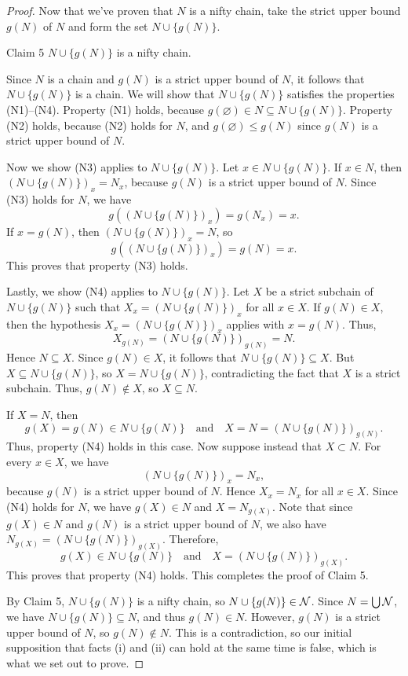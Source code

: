 \begin{proof}
	Now that we've proven that $N$ is a nifty chain, take the strict upper bound $g(N)$ of $N$ and form the set $N\cup\{g(N)\}$.
	
	\begin{manualthm}{Claim 5}
		$N\cup\{g(N)\}$ is a nifty chain.
	\end{manualthm}
	\begin{claimproof}
		Since $N$ is a chain and $g(N)$ is a strict upper bound of $N$, it follows that $N\cup\{g(N)\}$ is a chain.
		We will show that $N\cup\{g(N)\}$ satisfies the properties (N1)--(N4).
		Property (N1) holds, because $g(\varnothing)\in N\subseteq N\cup\{g(N)\}$.
		Property (N2) holds, because (N2) holds for $N$, and $g(\varnothing)\le g(N)$ since $g(N)$ is a strict upper bound of $N$.
		
		Now we show (N3) applies to $N\cup\{g(N)\}$.
		Let $x\in N\cup\{g(N)\}$.
		If $x\in N$, then $(N\cup\{g(N)\})_{x} = N_{x}$, because $g(N)$ is a strict upper bound of $N$.
		Since (N3) holds for $N$, we have
		\[ g((N\cup\{g(N)\})_{x}) = g(N_{x}) = x. \]
		If $x = g(N)$, then $(N\cup\{g(N)\})_{x} = N$, so
		\[ g((N\cup\{g(N)\})_{x}) = g(N) = x. \]
		This proves that property (N3) holds.
		
		Lastly, we show (N4) applies to $N\cup\{g(N)\}$.
		Let $X$ be a strict subchain of $N\cup\{g(N)\}$ such that $X_{x} = (N\cup\{g(N)\})_{x}$ for all $x\in X$.
		If $g(N)\in X$, then the hypothesis $X_{x} = (N\cup\{g(N)\})_{x}$ applies with $x = g(N)$.
		Thus,
		\[ X_{g(N)} = (N\cup\{g(N)\})_{g(N)} = N. \]
		Hence $N\subseteq X$.
		Since $g(N)\in X$, it follows that $N\cup\{g(N)\}\subseteq X$.
		But $X\subseteq N\cup\{g(N)\}$, so $X = N\cup\{g(N)\}$, contradicting the fact that $X$ is a strict subchain.
		Thus, $g(N)\notin X$, so $X\subseteq N$.
		
		If $X = N$, then 
		\[ g(X) = g(N)\in N\cup\{g(N)\} \quad\text{and}\quad X = N = (N\cup\{g(N)\})_{g(N)}. \]
		Thus, property (N4) holds in this case.
		Now suppose instead that $X\subset N$.
		For every $x\in X$, we have
		\[ (N\cup\{g(N)\})_{x} = N_{x}, \]
		because $g(N)$ is a strict upper bound of $N$.
		Hence $X_{x} = N_{x}$ for all $x\in X$.
		Since (N4) holds for $N$, we have $g(X)\in N$ and $X = N_{g(X)}$.
		Note that since $g(X)\in N$ and $g(N)$ is a strict upper bound of $N$, we also have $N_{g(X)} = (N\cup\{g(N)\})_{g(X)}$.
		Therefore,
		\[ g(X)\in N\cup\{g(N)\} \quad\text{and}\quad X = (N\cup\{g(N)\})_{g(X)}. \]
		This proves that property (N4) holds.
		This completes the proof of Claim 5.
	\end{claimproof}
	
	By Claim 5, $N\cup\{g(N)\}$ is a nifty chain, so $N\cup\{g(N)\}\in\mathcal{N}$.
	Since $N = \bigcup\mathcal{N}$, we have $N\cup\{g(N)\}\subseteq N$, and thus $g(N)\in N$.
	However, $g(N)$ is a strict upper bound of $N$, so $g(N)\notin N$.
	This is a contradiction, so our initial supposition that facts (i) and (ii) can hold at the same time is false, which is what we set out to prove.
\end{proof}






